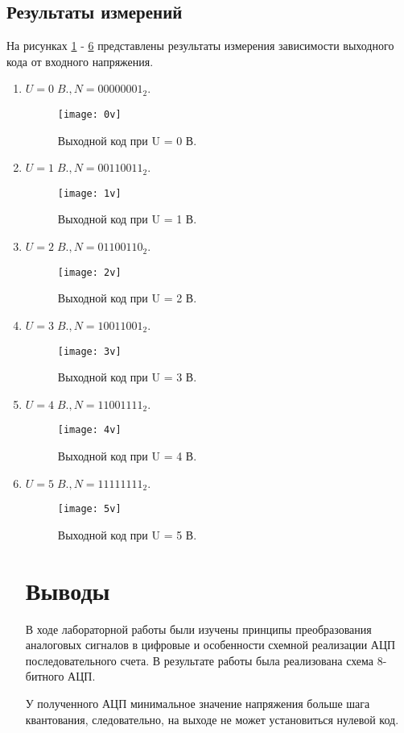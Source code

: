 \documentclass[a4paper,14pt]{extarticle}
\begin{document}
\subsection{Результаты измерений}
На рисунках \ref{fig:0v} - \ref{fig:5v} представлены результаты измерения зависимости выходного
кода от входного напряжения.
\begin{enumerate}
    \item $U = 0 \; B., N = 00000001_{2}$.
        \begin{figure}[H]
            \centering
            \texttt{[image: 0v]}
            \caption{Выходной код при U = 0 В.}
            \label{fig:0v}
        \end{figure}
    \item $U = 1 \; B., N = 00110011_{2}$.
        \begin{figure}[H]
            \centering
            \texttt{[image: 1v]}
            \caption{Выходной код при U = 1 В.}
            \label{fig:1v}
        \end{figure}
    \item $U = 2 \; B., N = 01100110_{2}$.
        \begin{figure}[H]
            \centering
            \texttt{[image: 2v]}
            \caption{Выходной код при U = 2 В.}
            \label{fig:2v}
        \end{figure}
        \pagebreak
    \item $U = 3 \; B., N = 10011001_{2}$.
        \begin{figure}[H]
            \centering
            \texttt{[image: 3v]}
            \caption{Выходной код при U = 3 В.}
            \label{fig:3v}
        \end{figure}
    \item $U = 4 \; B., N = 11001111_{2}$.
        \begin{figure}[H]
            \centering
            \texttt{[image: 4v]}
            \caption{Выходной код при U = 4 В.}
            \label{fig:4v}
        \end{figure}
    \item $U = 5 \; B., N = 11111111_{2}$.
        \begin{figure}[H]
            \centering
            \texttt{[image: 5v]}
            \caption{Выходной код при U = 5 В.}
            \label{fig:5v}
        \end{figure}
\section*{Выводы}
В ходе лабораторной работы были изучены принципы преобразования аналоговых
сигналов в цифровые и особенности схемной реализации АЦП последовательного
счета. В результате работы была реализована схема 8-битного АЦП.

У полученного АЦП минимальное значение напряжения больше шага квантования,
следовательно, на выходе не может установиться нулевой код.
\end{enumerate}
\end{document}
